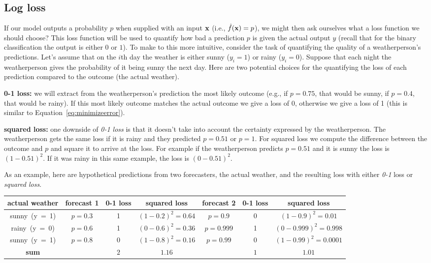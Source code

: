 \documentclass[assignment03_Solutions]{subfiles}
\begin{document}
\subsection{Log loss}
If our model outputs a probability $p$ when supplied with an input $\mathbf{x}$ (i.e., $\hat{f}(\mathbf{x}) = p$), we might then ask ourselves what a loss function we should choose?  This loss function will be used to quantify how bad a prediction $p$ is given the actual output $y$ (recall that for the binary classification the output is either $0$ or $1$).  To make to this more intuitive, consider the task of quantifying the quality of a weatherperson's predictions.  Let's assume that on the $i$th day the weather is either sunny ($y_i = 1$) or rainy ($y_i = 0$).  Suppose that each night the weatherperson gives the probability of it being sunny the next day.  Here are two potential choices for the  quantifying the loss of each prediction compared to the outcome (the actual weather).
\be
\item \textbf{0-1 loss:} we will extract from the weatherperson's prediction the most likely outcome (e.g., if $p = 0.75$, that would be sunny, if $p = 0.4$, that would be rainy).  If this most likely outcome matches the actual outcome we give a loss of 0, otherwise we give a loss of 1 (this is similar to Equation~\ref{eq:minimizeerror}).
\item \textbf{squared loss:} one downside of \emph{0-1 loss} is that it doesn't take into account the certainty expressed by the weatherperson.  The weatherperson gets the same loss if it is rainy and they predicted $p = 0.51$ or $p = 1$.  For squared loss we compute the difference between the outcome and $p$ and square it to arrive at the loss.  For example if the weatherperson predicts $p = 0.51$ and it is sunny the loss is $(1 - 0.51)^2$.  If it was rainy in this same example, the loss is $(0 - 0.51)^2$.
\ee

As an example, here are hypothetical predictions from two forecasters, the actual weather, and the resulting loss with either \emph{0-1} loss or \emph{squared loss}.


\begin{table}
\centering
\small
\begin{tabular}{c | c | c | c | c | c | c}
\hline
actual weather & forecast 1 & 0-1 loss & squared loss & forecast 2 & 0-1 loss & squared loss \\
\hline
\mbox{sunny (y = 1)} & $p = 0.3$ & 1 & $(1-0.2)^2 = 0.64$ & $p = 0.9$ & 0 & $(1 - 0.9)^2 = 0.01$\\
\mbox{rainy (y = 0)} & $p = 0.6$  & 1 & $(0-0.6)^2 = 0.36$ & $p = 0.999$ & 1 & $(0 - 0.999)^2 = 0.998$ \\ 
\mbox{sunny (y = 1)} & $p = 0.8$ & 0 & $(1-0.8)^2 = 0.16$ & $p = 0.99$ & 0 & $(1 - 0.99)^2 = 0.0001$\\
\hline
\textbf{sum} & & $2$ & $1.16$ & & $1$ & $1.01$
\end{tabular}
\end{table}
\end{document}
